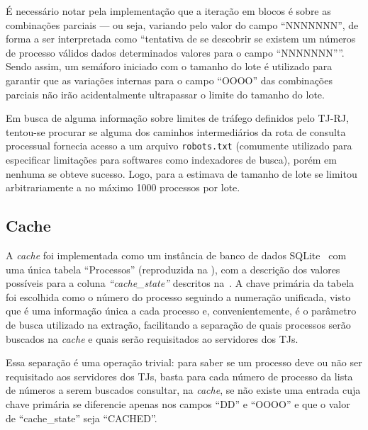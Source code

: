 É necessário notar pela implementação que a iteração em blocos é sobre as
combinações parciais --- ou seja, variando pelo valor do campo ``NNNNNNN'', de
forma a ser interpretada como ``tentativa de se descobrir se existem um números
de processo válidos dados determinados valores para o campo ``NNNNNNN''''.
Sendo assim, um semáforo iniciado com o tamanho do lote é utilizado para
garantir que as variações internas para o campo ``OOOO'' das combinações
parciais não irão acidentalmente ultrapassar o limite do tamanho do lote.

Em busca de alguma informação sobre limites de tráfego definidos pelo TJ-RJ,
tentou-se procurar se alguma dos caminhos intermediários da rota de consulta
processual fornecia acesso a um arquivo \texttt{robots.txt} (comumente
utilizado para especificar limitações para softwares como indexadores de
busca), porém em nenhuma se obteve sucesso. Logo, para a estimava de tamanho de
lote se limitou arbitrariamente a no máximo 1000 processos por lote.

\subsection{Cache}

A \textit{cache} foi implementada como um instância de banco de dados
SQLite~\cite{tool:sqlite} com uma única tabela ``Processos'' (reproduzida na
), com a descrição dos valores possíveis
para a coluna \textit{``cache\_state''} descritos
na~. A chave primária da tabela foi escolhida
como o número do processo seguindo a numeração unificada, visto que é uma
informação única a cada processo e, convenientemente, é o parâmetro de busca
utilizado na extração, facilitando a separação de quais processos serão
buscados na \textit{cache} e quais serão requisitados ao servidores dos TJs.

Essa separação é uma operação trivial: para saber se um processo deve ou não
ser requisitado aos servidores dos TJs, basta para cada número de processo da
lista de números a serem buscados consultar, na \textit{cache}, se não existe
uma entrada cuja chave primária se diferencie apenas nos campos ``DD'' e
``OOOO'' e que o valor de ``cache\_state'' seja ``CACHED''.

